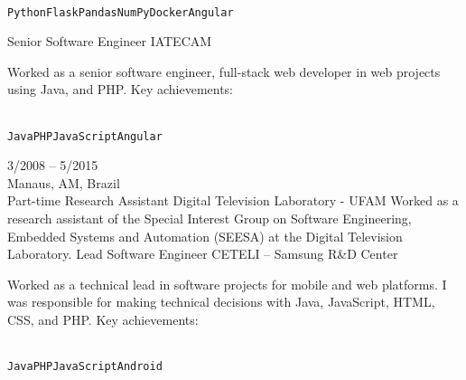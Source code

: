 \documentclass[10pt]{developercv} %
\begin{document}
\begin{entrylist}
{\begin{contributionlist}
    \end{contributionlist}\\
    \texttt{Python}\slashsep\texttt{Flask}\slashsep\texttt{Pandas}\slashsep\texttt{NumPy}\slashsep\texttt{Docker}\slashsep\texttt{Angular}}
  {Senior Software Engineer}
  {IATECAM}
  {
    Worked as a senior software engineer, full-stack web developer in web projects using Java, and PHP. Key achievements:\\
    \begin{contributionlist}
    \end{contributionlist}\\
    \texttt{Java}\slashsep\texttt{PHP}\slashsep\texttt{JavaScript}\slashsep\texttt{Angular}}
  \entry
  {3/2008 -- 5/2015\\\footnotesize{Manaus, AM, Brazil}\\\footnotesize{Part-time}}
  {Research Assistant}
  {Digital Television Laboratory - UFAM}
  {
    Worked as a research assistant of the Special Interest Group on Software Engineering, Embedded Systems and Automation (SEESA) at the Digital Television Laboratory.
  }
  {Lead Software Engineer}
  {CETELI -- Samsung R\&D Center}
  {
    Worked as a technical lead in software projects for mobile and web platforms. I was responsible for making technical decisions with Java, JavaScript, HTML, CSS, and PHP. Key achievements:\\
    \begin{contributionlist}
    \end{contributionlist}\\
    \texttt{Java}\slashsep\texttt{PHP}\slashsep\texttt{JavaScript}\slashsep\texttt{Android}}

\end{entrylist}
\end{document}
